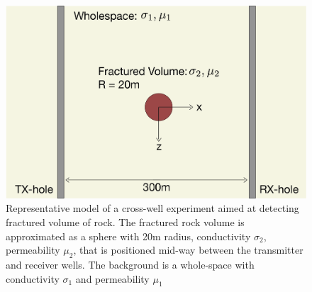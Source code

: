 \begin{figure}
    \begin{center}
    \includegraphics[width=\columnwidth]{figures/phys_prop_model/sphere_frac.png}
    \end{center}
\caption{
    Representative model of a cross-well experiment aimed at detecting
    fractured volume of rock. The fractured rock volume is approximated as a sphere
    with 20m radius, conductivity $\sigma_2$, permeability $\mu_2$, that is
    positioned mid-way between the transmitter and receiver wells. The background
    is a whole-space with conductivity $\sigma_1$ and permeability $\mu_1$
}
\label{fig:sphere_frac}
\end{figure}
